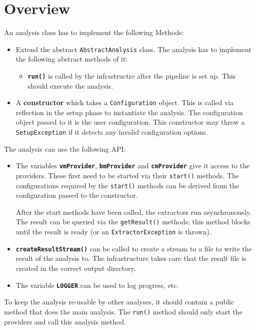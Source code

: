 \section{Overview}

An analysis class has to implement the following Methods:
\begin{itemize}
    \item Extend the abstract \texttt{AbstractAnalysis} class. The analysis has to implement the following abstract methods of it:
    \begin{itemize}
        \item \textbf{\texttt{run()}} is called by the infrastructre after the pipeline is set up. This should execute the analysis.
    \end{itemize}
    \item A \textbf{constructor}  which takes a \texttt{Configuration} object. This is called via reflection in the setup phase to instantiate the analysis. The configuration object passed to it is the user configuration. This constructor may throw a \texttt{SetupException} if it detects any invalid configuration options.
\end{itemize}
The analysis can use the following API:

\begin{itemize}
    \item The variables \textbf{\texttt{vmProvider}}, \textbf{\texttt{bmProvider}} and \textbf{\texttt{cmProvider}} give it access to the providers. These first need to be started via their \texttt{start()} methods. The configurations required by the \texttt{start()} methods can be derived from the configuration passed to the constructor.
    
    After the start methods have been called, the extractors run asynchronously. The result can be queried via the \texttt{getResult()} methods; this method blocks until the result is ready (or an \texttt{ExtractorException} is thrown).
    \item \textbf{\texttt{createResultStream()}} can be called to create a stream to a file to write the result of the analysis to. The infrastructure takes care that the result file is created in the correct output directory.
    \item The variable \textbf{\texttt{LOGGER}} can be used to log progress, etc.
\end{itemize}

To keep the analysis re-usable by other analyses, it should contain a public method that does the main analysis. The \texttt{run()} method should only start the providers and call this analysis method.

